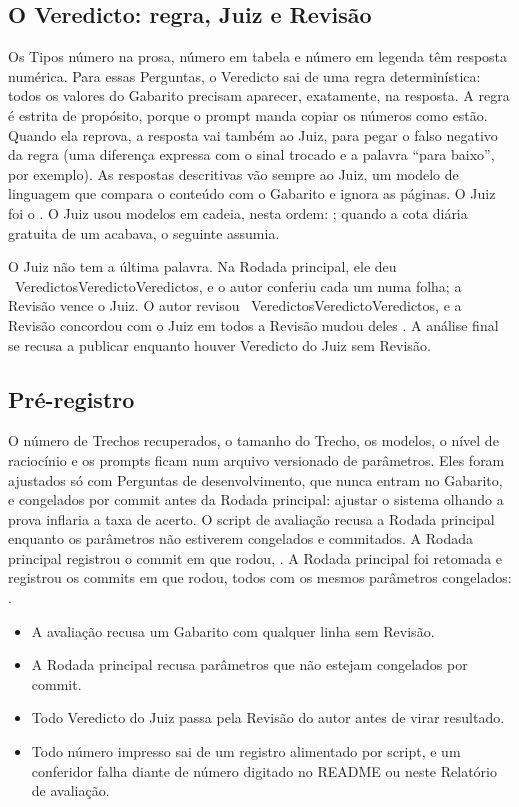 \documentclass[11pt,a4paper]{article}
\newcommand{\contagem}[3]{%
  #1~\ifcase#1\relax #3\or #2\else #3\fi}
\newcommand{\RevisaoMudou}{%
  \ifcase\NumRevisaoVeredictosMudados\relax
    a Revisão concordou com o Juiz em todos%
  \else
    a Revisão mudou \NumRevisaoVeredictosMudados{} deles%
  \fi}
\newcommand{\JuizDaRodada}{%
  \ifcase\NumParametrosNModelosJuiz\relax
  \or
    O Juiz foi o \texttt{\NumParametrosModeloJuiz}.%
  \else
    O Juiz usou \NumParametrosNModelosJuiz{} modelos em cadeia, nesta
    ordem: \NumParametrosModeloJuiz; quando a cota diária gratuita de um
    acabava, o seguinte assumia.%
  \fi}
\newcommand{\CommitsDaRodada}{%
  \ifcase\NumParametrosNCommits\relax
  \or
    A Rodada principal registrou o commit em que rodou,
    \texttt{\NumParametrosCommits}.%
  \else
    A Rodada principal foi retomada e registrou os
    \NumParametrosNCommits{} commits em que rodou, todos com os mesmos
    parâmetros congelados: \NumParametrosCommits.%
  \fi}
\begin{document}
\subsection{O Veredicto: regra, Juiz e Revisão}

Os Tipos número na prosa, número em tabela e número em legenda têm resposta
numérica. Para essas Perguntas, o Veredicto sai
de uma regra determinística: todos os valores do Gabarito precisam aparecer,
exatamente, na resposta. A regra é estrita de propósito, porque o prompt
manda copiar os números como estão. Quando ela reprova, a resposta vai
também ao Juiz, para pegar o falso negativo da regra (uma diferença
expressa com o sinal trocado e a palavra ``para baixo'', por exemplo). As
respostas descritivas vão sempre ao Juiz, um modelo de linguagem que
compara o conteúdo com o Gabarito e ignora as páginas. \JuizDaRodada

O Juiz não tem a última palavra. Na Rodada principal, ele deu
\contagem{\NumRevisaoVeredictosJuiz}{Veredicto}{Veredictos}, e o autor
conferiu cada um numa folha; a Revisão vence o Juiz. O autor revisou
\contagem{\NumRevisaoVeredictosRevisados}{Veredicto}{Veredictos}, e
\RevisaoMudou. A análise final se
recusa a publicar enquanto houver Veredicto do Juiz sem Revisão.

\subsection{Pré-registro}

O número de Trechos recuperados, o tamanho do Trecho, os modelos, o nível
de raciocínio e os prompts ficam num arquivo versionado de parâmetros. Eles
foram ajustados só com Perguntas de desenvolvimento, que nunca entram no
Gabarito, e congelados por commit antes da Rodada principal: ajustar o
sistema olhando a prova inflaria a taxa de acerto. O script de avaliação
recusa a Rodada principal enquanto os parâmetros não estiverem congelados e
commitados. \CommitsDaRodada

\begin{destaque}
  \begin{itemize}[leftmargin=*, itemsep=1pt, topsep=2pt]
    \item A avaliação recusa um Gabarito com qualquer linha sem Revisão.
    \item A Rodada principal recusa parâmetros que não estejam congelados por
      commit.
    \item Todo Veredicto do Juiz passa pela Revisão do autor antes de virar
      resultado.
    \item Todo número impresso sai de um registro alimentado por script, e um
      conferidor falha diante de número digitado no README ou neste
      Relatório de avaliação.
  \end{itemize}
\end{destaque}
\end{document}
